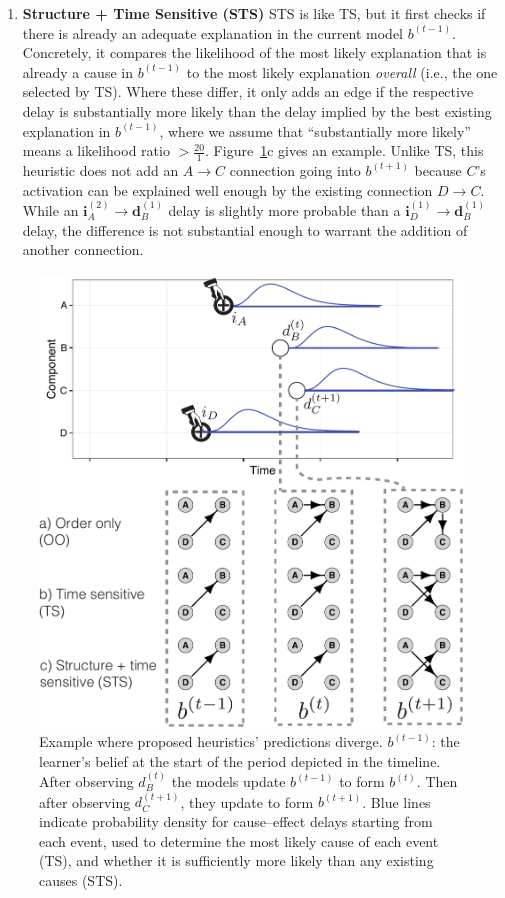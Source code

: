 \documentclass[10pt,letterpaper]{article}
\newcommand{\ci}{\mathbf{i}} %
\newcommand{\da}{\mathbf{d}} %
\begin{document}
\begin{enumerate}[topsep=5pt,itemsep=1pt,partopsep=1ex,parsep=1ex]
\item \textbf{Structure + Time Sensitive (STS)} STS is like TS, but it first checks if there is already an adequate explanation in the current model $b^{(t-1)}$.  Concretely, it compares the likelihood of the most likely explanation that is already a cause in $b^{(t-1)}$ to the most likely explanation \emph{overall} (i.e., the one selected by TS).  Where these differ, it only adds an edge if the respective delay is substantially more likely than the delay implied by the best existing explanation in $b^{(t-1)}$, where we assume that ``substantially more likely'' means a likelihood ratio $>\frac{20}{1}$. 
Figure~\ref{fig:heuristic_example}c gives an example.  Unlike TS, this heuristic does not add an $A\rightarrow C$ connection going into $b^{(t+1)}$ because $C$'s activation can be explained well enough by the existing connection $D\rightarrow C$.  While an $\ci^{(2)}_A\rightarrow \da^{(1)}_B$ delay is slightly more probable than a $\ci^{(1)}_D\rightarrow \da^{(1)}_B$ delay, the difference is not substantial enough to warrant the addition of another connection.
\end{enumerate}

\begin{figure}[t!]
   \centering
   \includegraphics[width = .9\columnwidth]{heuristic_example}
   \caption{Example where proposed heuristics' predictions diverge.  $b^{(t-1)}$: the learner's belief at the start of the period depicted in the timeline.  After observing $d_B^{(t)}$ the models update $b^{(t-1)}$ to form $b^{(t)}$.  Then after observing $d_C^{(t+1)}$, they update to form $b^{(t+1)}$.  Blue lines indicate probability density for cause--effect delays starting from each event, used to determine the most likely cause of each event (TS), and whether it is sufficiently more likely than any existing causes (STS).}
   \label{fig:heuristic_example}
   \vspace{-0.6cm}
\end{figure}
\end{document}
